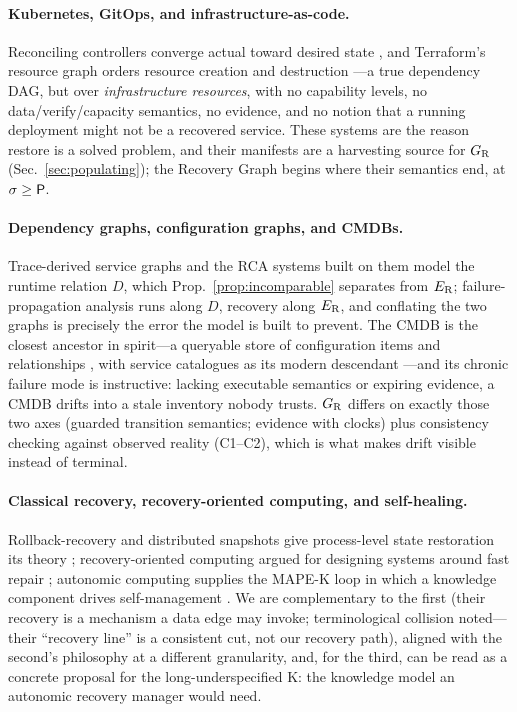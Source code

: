 \paragraph{Kubernetes, GitOps, and infrastructure-as-code.}
Reconciling controllers converge actual toward desired state \citep{burns2016borg,argocd}, and Terraform's resource graph orders resource creation and destruction \citep{terraformgraph,morris2020iac}---a true dependency DAG, but over \emph{infrastructure resources}, with no capability levels, no data/verify/capacity semantics, no evidence, and no notion that a running deployment might not be a recovered service. These systems are the reason restore is a solved problem, and their manifests are a harvesting source for $G_{\mathrm{R}}$ (Sec.~\ref{sec:populating}); the Recovery Graph begins where their semantics end, at $\sigma \geq \mathsf{P}$.

\paragraph{Dependency graphs, configuration graphs, and CMDBs.}
Trace-derived service graphs \citep{sigelman2010dapper,luo2021characterizing} and the RCA systems built on them \citep{wu2020microrca,gan2021sage} model the runtime relation $D$, which Prop.~\ref{prop:incomparable} separates from $E_{\mathrm{R}}$; failure-propagation analysis runs along $D$, recovery along $E_{\mathrm{R}}$, and conflating the two graphs is precisely the error the model is built to prevent. The CMDB is the closest ancestor in spirit---a queryable store of configuration items and relationships \citep{itil2019}, with service catalogues as its modern descendant \citep{backstage}---and its chronic failure mode is instructive: lacking executable semantics or expiring evidence, a CMDB drifts into a stale inventory nobody trusts. $G_{\mathrm{R}}$ differs on exactly those two axes (guarded transition semantics; evidence with clocks) plus consistency checking against observed reality (C1--C2), which is what makes drift visible instead of terminal.

\paragraph{Classical recovery, recovery-oriented computing, and self-healing.}
Rollback-recovery and distributed snapshots give process-level state restoration its theory \citep{elnozahy2002rollback,chandy1985snapshots}; recovery-oriented computing argued for designing systems around fast repair \citep{patterson2002roc,candea2004microreboot,brown2003undo}; autonomic computing supplies the MAPE-K loop in which a knowledge component drives self-management \citep{kephart2003autonomic}. We are complementary to the first (their recovery is a mechanism a \textsf{data} edge may invoke; terminological collision noted---their ``recovery line'' is a consistent cut, not our recovery path), aligned with the second's philosophy at a different granularity, and, for the third, can be read as a concrete proposal for the long-underspecified K: the knowledge model an autonomic recovery manager would need.

